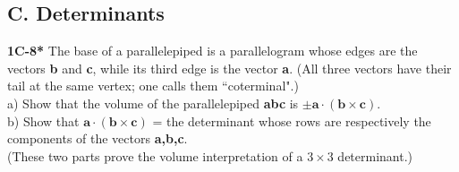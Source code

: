 \documentclass{article}
\begin{document}
\subsection{C. Determinants}
%
%
\textbf{1C-8*} The base of a parallelepiped is a parallelogram whose edges are the vectors \textbf{b} and \textbf{c}, while its third edge is the vector \textbf{a}. (All three vectors have their tail at the same vertex; one calls them ``coterminal".)
\\ a) Show that the volume of the parallelepiped \textbf{abc} is $\pm\mathbf{a} \cdot ( \mathbf{b} \times \mathbf{c})$.
\\ b) Show that $\mathbf{a} \cdot (\mathbf{b} \times \mathbf{c})$ = the determinant whose rows are respectively the components of the vectors \textbf{a,b,c}.
\\ (These two parts prove the volume interpretation of a $3 \times 3$ determinant.)
% 
%
\end{document}
